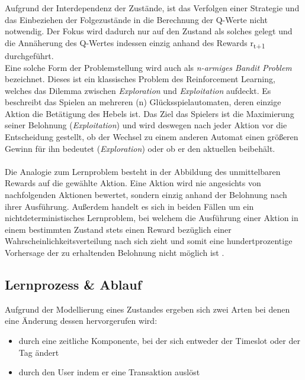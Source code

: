 Aufgrund der Interdependenz der Zustände, ist das Verfolgen einer Strategie und das Einbeziehen der Folgezustände in die Berechnung der Q-Werte nicht notwendig. Der Fokus wird dadurch nur auf den Zustand als solches gelegt und die Annäherung des  Q-Wertes indessen einzig anhand des Rewards r\textsubscript{t+1} durchgeführt. \\
Eine solche Form der Problemstellung wird auch als \textit{n-armiges Bandit Problem} bezeichnet. Dieses ist ein klassisches Problem des Reinforcement Learning, welches das Dilemma zwischen \textit{Exploration} und \textit{Exploitation} aufdeckt. Es beschreibt das Spielen an mehreren (n) Glücksspielautomaten, deren einzige Aktion die Betätigung des Hebels ist. Das Ziel das Spielers ist die Maximierung seiner Belohnung (\textit{Exploitation}) und wird deswegen nach jeder Aktion vor die Entscheidung gestellt, ob der Wechsel zu einem anderen Automat einen größeren Gewinn für ihn bedeutet (\textit{Exploration}) oder ob er den aktuellen beibehält. \\\\
Die Analogie zum Lernproblem besteht in der Abbildung des unmittelbaren Rewards auf die gewählte Aktion. Eine Aktion wird nie angesichts von nachfolgenden Aktionen bewertet, sondern einzig anhand der Belohnung nach ihrer Ausführung. Außerdem handelt es sich in beiden Fällen um ein nichtdeterministisches Lernproblem, bei welchem die Ausführung einer Aktion in einem bestimmten Zustand stets einen Reward bezüglich einer Wahrscheinlichkeitsverteilung nach sich zieht und somit eine hundertprozentige Vorhersage der zu erhaltenden Belohnung nicht möglich ist \cite{Sutton}.

\subsection{Lernprozess \& Ablauf}
\label{subsec:learning}

Aufgrund der Modellierung eines Zustandes ergeben sich zwei Arten bei denen eine Änderung dessen hervorgerufen wird: 
\begin{itemize}
	\item durch eine zeitliche Komponente, bei der sich entweder der Timeslot oder der Tag ändert
	\item durch den User indem er eine Transaktion auslöst
\end{itemize}

